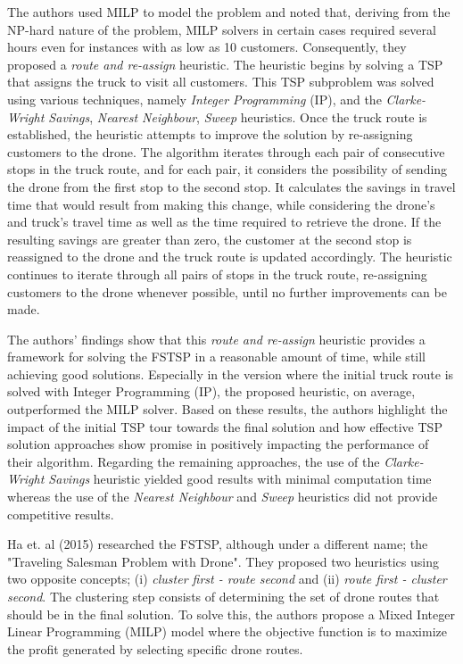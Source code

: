 \documentclass{article}
\begin{document}
	The authors used MILP to model the problem and noted that, deriving from the NP-hard nature of the problem, MILP solvers in certain cases required several hours even for instances with as low as 10 customers. Consequently, they proposed a \textit{route and re-assign} heuristic. The heuristic begins by solving a TSP that assigns the truck to visit all customers. This TSP subproblem was solved using various techniques, namely \textit{Integer Programming} (IP), and the  \textit{Clarke-Wright Savings}, \textit{Nearest Neighbour}, \textit{Sweep} heuristics. Once the truck route is established, the heuristic attempts to improve the solution by re-assigning customers to the drone. The algorithm iterates through each pair of consecutive stops in the truck route, and for each pair, it considers the possibility of sending the drone from the first stop to the second stop. It calculates the savings in travel time that would result from making this change, while considering the drone's and truck's travel time as well as the time required to retrieve the drone. If the resulting savings are greater than zero, the customer at the second stop is reassigned to the drone and the truck route is updated accordingly. The heuristic continues to iterate through all pairs of stops in the truck route, re-assigning customers to the drone whenever possible, until no further improvements can be made. 
	\par 
	The authors' findings show that this \textit{route and re-assign} heuristic provides a framework for solving the FSTSP in a reasonable amount of time, while still achieving good solutions. Especially in the version where the initial truck route is solved with Integer Programming (IP), the proposed heuristic, on average, outperformed the MILP solver. Based on these results, the authors highlight the impact of the initial TSP tour towards the final solution and how effective TSP solution approaches show promise in positively impacting the performance of their algorithm. Regarding the remaining approaches, the use of the \textit{Clarke-Wright Savings} heuristic yielded good results with minimal computation time whereas the use of the \textit{Nearest Neighbour} and \textit{Sweep} heuristics did not provide competitive results.
	\par
	Ha et. al (2015) researched the FSTSP, although under a different name; the "Traveling Salesman Problem with Drone". They proposed two heuristics using two opposite concepts; (i) \textit{cluster first - route second} and (ii) \textit{route first - cluster second}. The clustering step consists of determining the set of drone routes that should be in the final solution. To solve this, the authors propose a Mixed Integer Linear Programming (MILP) model where the objective function is to maximize the profit generated by selecting specific drone routes. 
\end{document}

